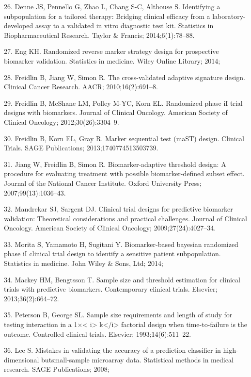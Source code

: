 \documentclass[11pt]{article}
\begin{document}
26. Denne JS, Pennello G, Zhao L, Chang S-C, Althouse S. Identifying a
subpopulation for a tailored therapy: Bridging clinical efficacy from a
laboratory-developed assay to a validated in vitro diagnostic test kit.
Statistics in Biopharmaceutical Research. Taylor \& Francis;
2014;6(1):78--88.

27. Eng KH. Randomized reverse marker strategy design for prospective
biomarker validation. Statistics in medicine. Wiley Online Library;
2014;

28. Freidlin B, Jiang W, Simon R. The cross-validated adaptive signature
design. Clinical Cancer Research. AACR; 2010;16(2):691--8.

29. Freidlin B, McShane LM, Polley M-YC, Korn EL. Randomized phase iI
trial designs with biomarkers. Journal of Clinical Oncology. American
Society of Clinical Oncology; 2012;30(26):3304--9.

30. Freidlin B, Korn EL, Gray R. Marker sequential test (maST) design.
Clinical Trials. SAGE Publications; 2013;1740774513503739.

31. Jiang W, Freidlin B, Simon R. Biomarker-adaptive threshold design: A
procedure for evaluating treatment with possible biomarker-defined
subset effect. Journal of the National Cancer Institute. Oxford
University Press; 2007;99(13):1036--43.

32. Mandrekar SJ, Sargent DJ. Clinical trial designs for predictive
biomarker validation: Theoretical considerations and practical
challenges. Journal of Clinical Oncology. American Society of Clinical
Oncology; 2009;27(24):4027--34.

33. Morita S, Yamamoto H, Sugitani Y. Biomarker-based bayesian
randomized phase iI clinical trial design to identify a sensitive
patient subpopulation. Statistics in medicine. John Wiley \& Sons, Ltd;
2014;

34. Mackey HM, Bengtsson T. Sample size and threshold estimation for
clinical trials with predictive biomarkers. Contemporary clinical
trials. Elsevier; 2013;36(2):664--72.

35. Peterson B, George SL. Sample size requirements and length of study
for testing interaction in a 1\(\times\)\textless{} i\textgreater{}
k\textless{}/i\textgreater{} factorial design when time-to-failure is
the outcome. Controlled clinical trials. Elsevier; 1993;14(6):511--22.

36. Lee S. Mistakes in validating the accuracy of a prediction
classifier in high-dimensional butsmall-sample microarray data.
Statistical methods in medical research. SAGE Publications; 2008;
\end{document}
